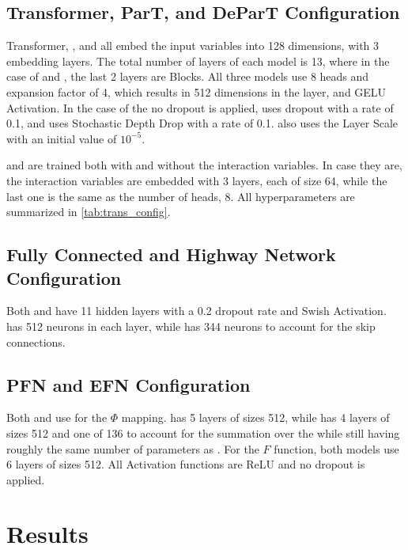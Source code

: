 \subsection{Transformer, ParT, and DeParT Configuration}
\label{sec:transformer_config}

Transformer, \ParT, and \depart all embed the input variables into 128 dimensions, with 3 embedding layers.
The total number of layers of each model is 13, where in the case of \depart and \ParT, the last 2 layers are \CA Blocks.
All three models use 8 heads and \FFN expansion factor of 4, which results in 512 dimensions in the \FFN layer, and GELU Activation.
In the case of the \trans no dropout is applied, \ParT uses dropout with a rate of 0.1, and \depart uses Stochastic Depth Drop with a rate of 0.1.
\depart also uses the Layer Scale with an initial value of $10^{-5}$.

\ParT and \depart are trained both with and without the interaction variables.
In case they are, the interaction variables are embedded with 3 layers, each of size 64, while the last one is the same as the number of heads, 8.
All hyperparameters are summarized in \cref{tab:trans_config}.

\subsection{Fully Connected and Highway Network Configuration}
\label{sec:fc_config}

Both \fc and \highway have 11 hidden layers with a 0.2 dropout rate and Swish Activation.
\fc has 512 neurons in each layer, while \highway has 344 neurons to account for the skip connections.

\subsection{PFN and EFN Configuration}
\label{sec:efn_config}

Both \PFN and \EFN use \pointCNN for the $\Phi$ mapping. 
\PFN has 5 layers of sizes 512, while \EFN has 4 layers of sizes 512 and one of 136 to account for the summation over the \PFOs while still having roughly the same number of parameters as \PFN.
For the $F$ function, both models use 6 layers of sizes 512. 
All Activation functions are ReLU and no dropout is applied.


\section{Results}
\label{sec:results}




